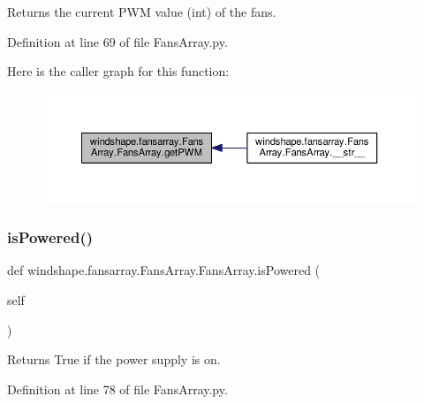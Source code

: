 \begin{DoxyVerb}Returns the current PWM value (int) of the fans.\end{DoxyVerb}
 

Definition at line 69 of file Fans\+Array.\+py.

Here is the caller graph for this function\+:\nopagebreak
\begin{figure}[H]
\begin{center}
\leavevmode
\includegraphics[width=350pt]{classwindshape_1_1fansarray_1_1_fans_array_1_1_fans_array_a56e88cf7d3e1c3804ad8f22bae65ac45_icgraph}
\end{center}
\end{figure}
\mbox{\label{classwindshape_1_1fansarray_1_1_fans_array_1_1_fans_array_ae9e1608f5d5faf5602a036983dec76ea}} 
\subsubsection{\texorpdfstring{is\+Powered()}{isPowered()}}
{\footnotesize\ttfamily def windshape.\+fansarray.\+Fans\+Array.\+Fans\+Array.\+is\+Powered (\begin{DoxyParamCaption}\item[{}]{self }\end{DoxyParamCaption})}

\begin{DoxyVerb}Returns True if the power supply is on.\end{DoxyVerb}
 

Definition at line 78 of file Fans\+Array.\+py.

